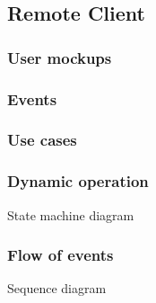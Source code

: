 %
\subsection{Remote Client}
\label{sec:remote-cli-decomp}

\subsubsection{User mockups}
\label{sec:user-mockups}

\subsubsection{Events}
\label{sec:events-1}

\subsubsection{Use cases}
\label{sec:use-cases-1}

\subsubsection{Dynamic operation}
\label{sec:dyn-oper-1}
State machine diagram

\subsubsection{Flow of events}
\label{sec:flow-events-1}
Sequence diagram

